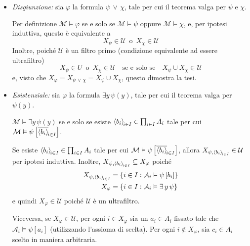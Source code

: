 {\begin{itemize}
\begin{itemize}
            Ma $ X_{\psi}\notin\mathcal{U}  $ se e solo se $ X_{\varphi} \in \mathcal{U}  $, poiché $ X_{\varphi}=I\setminus X_{\psi} $ e $ \mathcal{U} $ è ultrafiltro.
            \item \emph{Disgiunzione:} sia $ \varphi $ la formula $ \psi \,\lor\, \chi $, tale per cui il teorema valga per $ \psi $ e $ \chi $. 
            
            Per definizione $ \mathcal{M}\vDash \varphi $ se e solo se $ \mathcal{M}\vDash \psi $ oppure $ \mathcal{M}\vDash \chi $, e, per ipotesi induttiva, questo è equivalente a 
            \[
                X_{\psi} \in \mathcal{U}\,\text{ o }\,X_{\chi} \in \mathcal{U}  
            \]Inoltre, poiché $ \mathcal{U} $ è un filtro primo (condizione equivalente ad essere ultrafiltro) \[
                X_{\psi} \in U\,\text{ o }\,X_{\chi} \in \mathcal{U} \quad\text{se e solo se}\quad X_{\psi}\cup X_{\chi} \in \mathcal{U}   
            \]e, visto che $ X_{\varphi} = X_{\psi \,\lor\,\chi} = X_{\psi}\cup X_{\chi}     $, questo dimostra la tesi.
            \item \emph{Esistenziale:} sia $ \varphi $ la formula $ \exists y \, \psi(y) $, tale per cui il teorema valga per $ \psi(y) $. 
            
            $ \mathcal{M}\vDash \exists y \, \psi(y)$ se e solo se esiste $ \sequence[i \in I]{b_{i} } \in \prod_{i \in I} A_{i} $ tale per cui $ \mathcal{M}\vDash \psi\left[\filtersequence[i \in I]{b_{i} }\right] $. 
            
            Se esiste $\sequence[i \in I]{b_{i} } \in \prod_{i \in I} A_{i} $ tale per cui $ \mathcal{M}\vDash \psi\left[\filtersequence[i \in I]{b_{i} }\right]$, allora $ X_{\psi, \sequence[i \in I]{b_{i}}} \in \mathcal{U} $ per ipotesi induttiva. Inoltre, $ X_{\psi, \sequence[i \in I]{b_{i} }} \subseteq X_{\varphi} $ poiché \begin{align*}
                X_{\psi,\sequence[i \in I]{b_i}} &= \{ i \in I: \mathcal{A}_i\vDash \psi\left[b_{i} \right]\}\\ 
                X_{\varphi} &= \{i \in I: \mathcal{A}_i\vDash \exists\, y\,\psi\} 
            \end{align*}e quindi $ X_{\varphi} \in \mathcal{U}$ poiché $ \mathcal{U} $ è un ultrafiltro.
            
            Viceversa, se $ X_{\varphi} \in \mathcal{U}$, per ogni $ i \in  X_{\varphi}  $ sia un $ a_{i} \in A_{i}$ fissato tale che $ \mathcal{A}_i \vDash \psi[a_{i} ]$ (utilizzando l'assioma di scelta). Per ogni $ i \notin X_{\varphi}  $, sia $ c_{i} \in A_{i}$ scelto in maniera arbitraria. 


\end{itemize}
\end{itemize}}
